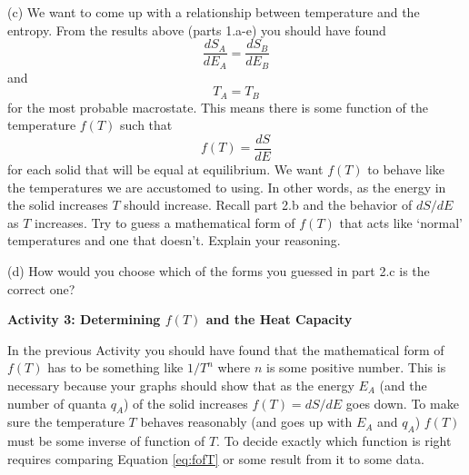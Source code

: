 (c) We want to come up with a relationship between temperature and the entropy.
From the results above (parts 1.a-e) you should have found
\begin{equation}
\frac{dS_A}{dE_A} = \frac{dS_B}{dE_B}
\end{equation}
and
\begin{equation}
T_A = T_B
\end{equation}
for the most probable macrostate.
This means there is some function of the temperature $f(T)$ such that
\begin{equation}\label{eq:fofT}
f(T) = \frac{dS}{dE}
\end{equation}
for each solid that will be equal at equilibrium.
We want $f(T)$ to behave like the temperatures we are accustomed to using.
In other words, as the energy in the solid increases $T$ should increase.
Recall part 2.b and the behavior of $dS/dE$ as $T$ increases.
Try to guess a mathematical form of $f(T)$ that acts like `normal' temperatures
and one that doesn't. Explain your reasoning.
\answerspace{30mm}

(d) How would you choose which of the forms you guessed in part 2.c is the correct one?
\answerspace{20mm}

\textbf{Activity 3: Determining $f(T)$ and the Heat Capacity}

In the previous Activity you should have found that the mathematical form of $f(T)$
has to be something like $1/T^n$ where $n$ is some positive number.
This is necessary because your graphs should show that as the energy $E_A$ (and the number
of quanta $q_A$) of the solid 
increases $f(T)=dS/dE$ goes down. To make sure the temperature $T$ behaves reasonably
(and goes up with $E_A$ and $q_A$) $f(T)$ must be some inverse of function of $T$.
To decide exactly which function is right requires comparing Equation \ref{eq:fofT} or some
result from it to some data.

